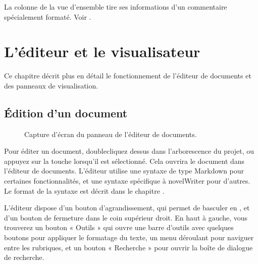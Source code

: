 \documentclass[a4paper,11pt,french]{sphinxmanual}
\begin{document}
\sphinxAtStartPar
La colonne  de la vue d’ensemble tire ses informations d’un commentaire spécialement formaté. Voir {\hyperref[\detokenize{usage_format:a-fmt-comm}]{}}.

\sphinxstepscope


\chapter{L’éditeur et le visualisateur}
\label{\detokenize{usage_writing:the-editor-and-viewer}}\label{\detokenize{usage_writing:a-ui-writing}}\label{\detokenize{usage_writing::doc}}
\sphinxAtStartPar
Ce chapitre décrit plus en détail le fonctionnement de l’éditeur de documents et des panneaux de visualisation.


\section{Édition d’un document}
\label{\detokenize{usage_writing:editing-a-document}}\label{\detokenize{usage_writing:a-ui-edit}}
\begin{figure}[htbp]
\centering
\capstart

\noindent{}
\caption{Capture d’écran du panneau de l’éditeur de documents.}\label{\detokenize{usage_writing:id1}}\end{figure}

\sphinxAtStartPar
Pour éditer un document, double\sphinxhyphen{}cliquez dessus dans l’arborescence du projet, ou appuyez sur la touche  lorsqu’il est sélectionné. Cela ouvrira le document dans l’éditeur de documents. L’éditeur utilise une syntaxe de type Markdown pour certaines fonctionnalités, et une syntaxe spécifique à novelWriter pour d’autres. Le format de la syntaxe est décrit dans le chapitre {\hyperref[\detokenize{usage_format:a-fmt}]{}}.

\sphinxAtStartPar
L’éditeur dispose d’un bouton d’agrandissement, qui permet de basculer en , et d’un bouton de fermeture dans le coin supérieur droit. En haut à gauche, vous trouverez un bouton « Outils » qui ouvre une barre d’outils avec quelques boutons pour appliquer le formatage du texte, un menu déroulant pour naviguer entre les rubriques, et un bouton « Recherche » pour ouvrir la boîte de dialogue de recherche.
\end{document}
